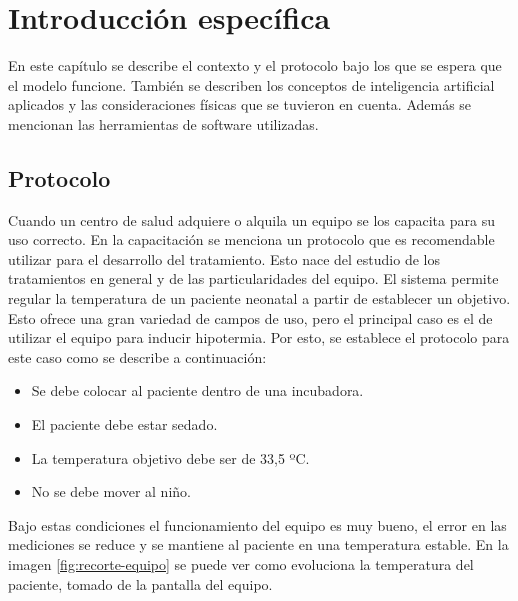 \chapter{Introducción específica} %

\label{Chapter2}

En este capítulo se describe el contexto y el protocolo bajo los que se espera que el modelo funcione. También se describen los conceptos de inteligencia artificial aplicados y las consideraciones físicas que se tuvieron en cuenta. Además se mencionan las herramientas de software utilizadas.

\section{Protocolo}

Cuando un centro de salud adquiere o alquila un equipo se los capacita para su uso correcto. En la capacitación se menciona un protocolo que es recomendable utilizar para el desarrollo del tratamiento. Esto nace del estudio de los tratamientos en general y de las particularidades del equipo.
El sistema permite regular la temperatura de un paciente neonatal a partir de establecer un objetivo. Esto ofrece una gran variedad de campos de uso, pero el principal caso es el de utilizar el equipo para inducir hipotermia. Por esto, se establece el protocolo para este caso como se describe a continuación:

\begin{itemize}
	\item Se debe colocar al paciente dentro de una incubadora.
	\item El paciente debe estar sedado.
	\item La temperatura objetivo debe ser de 33,5 ºC.
	\item No se debe mover al niño.
\end{itemize}

Bajo estas condiciones el funcionamiento del equipo es muy bueno, el error en las mediciones se reduce y se mantiene al paciente en una temperatura estable. En la imagen \ref{fig:recorte-equipo} se puede ver como evoluciona la temperatura del paciente, tomado de la pantalla del equipo. 

